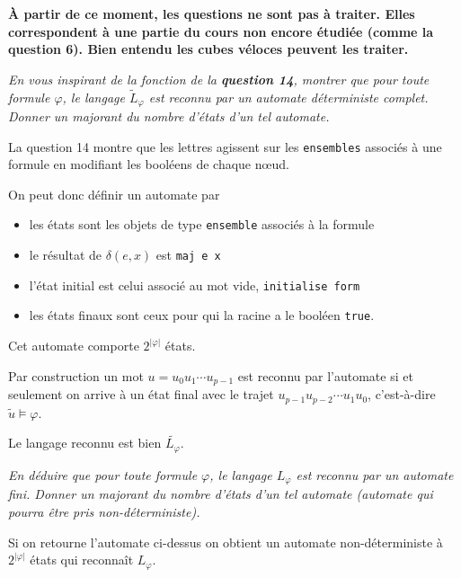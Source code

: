 \newpage

{\bf À partir de ce moment, les questions ne sont pas à traiter. Elles correspondent à une partie du cours non encore étudiée (comme la question {\bf 6}). Bien entendu les cubes véloces peuvent les traiter.}
\begin{Exercise}\it
En vous inspirant de la fonction  de la {\bf question 14}, montrer que pour toute formule $\varphi$, le langage $\widetilde L_\varphi$ est reconnu par un automate déterministe complet. Donner un majorant du nombre d'états d'un tel automate.
\end{Exercise}
\begin{Answer}
La question 14 montre que les lettres agissent sur les {\tt ensembles} associés à une formule en modifiant les booléens de chaque nœud. 

On peut donc définir un automate par

\begin{itemize}
  \item les états sont les objets de type {\tt ensemble} associés à la formule
  \item le résultat de $\delta(e, x)$ est  {\tt maj e x}
  \item l'état initial est celui associé au mot vide, {\tt initialise form}
  \item les états finaux sont ceux pour qui la racine a le booléen {\tt true}.
\end{itemize}

Cet automate comporte $2^{|\varphi|}$ états.

Par construction un mot $u=u_0u_1\cdots u_{p-1}$ est reconnu par l'automate si et seulement on arrive à un état final avec le trajet $u_{p-1}u_{p-2}\cdots u_1u_0$, c'est-à-dire $\widetilde u \vDash \varphi$. 

Le langage reconnu est bien $\widetilde{L_\varphi}$.
\end{Answer}
\begin{Exercise}\it
En déduire que pour toute formule $\varphi$, le langage $L_\varphi$ est reconnu par un automate fini. Donner un majorant du nombre d'états d'un tel automate (automate qui pourra être pris non-déterministe).
\end{Exercise}
\begin{Answer}
Si on retourne l'automate ci-dessus on obtient un automate non-déterministe à $2^{|\varphi|}$ états qui reconnaît $L_\varphi$.
\newpage
\end{Answer}
